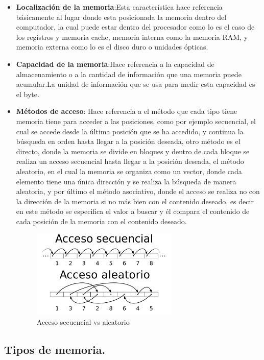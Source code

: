 \documentclass{article}
\begin{document}
\begin{itemize}
    \item \textbf{Localización de la memoria}:Esta característica hace referencia básicamente al lugar donde esta posicionada la memoria dentro del computador, la cual puede estar dentro del procesador como lo es el caso de los registros y memoria cache, memoria interna como la memoria RAM, y memoria externa como lo es el disco duro o unidades ópticas.
        
    \item \textbf{Capacidad de la memoria}:Hace referencia a la capacidad de almacenamiento o a la cantidad de información que una memoria puede acumular.La unidad de información que se usa para medir esta capacidad es el byte.\cite{arquitectura}
    
    \item \textbf {Métodos de acceso}: Hace referencia a el método que cada tipo tiene memoria tiene para acceder a las posiciones, como por ejemplo secuencial, el cual se accede desde la última posición que se ha accedido, y continua la búsqueda en orden hasta llegar a la posición deseada, otro método es el directo, donde la memoria se divide en bloques y dentro de cada bloque se realiza un acceso secuencial hasta llegar a la posición deseada, el método aleatorio, en el cual la memoria se organiza como un vector, donde cada elemento tiene una única dirección y se realiza la búsqueda de manera aleatoria, y por último el método asociativo, donde el acceso se realiza no con la dirección de la memoria si no más bien con el contenido deseado, es decir en este método se especifica el valor a buscar y él compara el contenido de cada posición de la memoria con el contenido deseado.\cite{arquitectura}
    \begin{figure}[h]
    \includegraphics[width=7cm]{accesos.png}
    \centering
    \caption{Acceso secuencial vs aleatorio}
    \label{vs2}
    \end{figure}
    \end{itemize}

\subsection{Tipos de memoria.} \label{tipos}%
\end{document}
